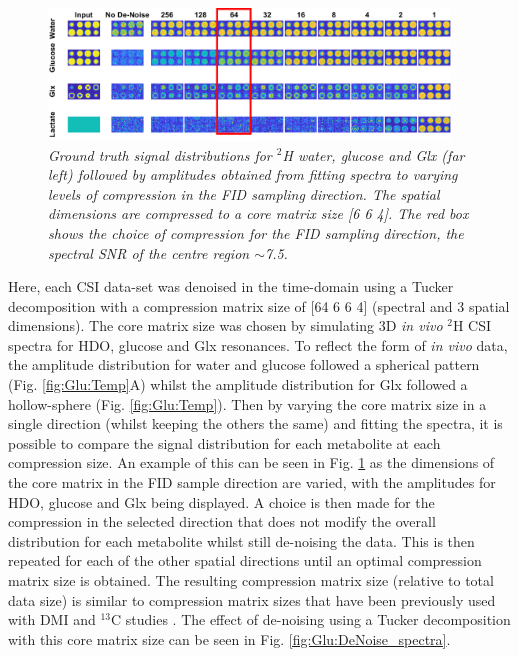 \begin{figure}
   \centering
   \includegraphics[width = 0.95\textwidth]{Figures/Glucose/DeNoise_Sim.png}
   \caption{\textit{Ground truth signal distributions for $^2$H water, glucose and Glx (far left) followed by amplitudes obtained from fitting spectra to varying levels of compression in the FID sampling direction. The spatial dimensions are compressed to a core matrix size [6 6 4]. The red box shows the choice of compression for the FID sampling direction, the spectral \ac{SNR} of the centre region $\sim$7.5.}}
   \label{fig:Glu:DeNoise}
\end{figure}

Here, each \ac{CSI} data-set was denoised in the time-domain using a Tucker decomposition \cite{Bader2007EfficientTensors} with a compression matrix size of [64 6 6 4] (spectral and 3 spatial dimensions). The core matrix size was chosen by simulating 3D \textit{in vivo} $^2$H \ac{CSI} spectra for HDO, glucose and Glx resonances. To reflect the form of \textit{in vivo} data, the amplitude distribution for water and glucose followed a spherical pattern (Fig. \ref{fig:Glu:Temp}A) whilst the amplitude distribution for Glx followed a hollow-sphere (Fig. \ref{fig:Glu:Temp}). Then by varying the core matrix size in a single direction (whilst keeping the others the same) and fitting the spectra, it is possible to compare the signal distribution for each metabolite at each compression size. An example of this can be seen in Fig. \ref{fig:Glu:DeNoise} as the dimensions of the core matrix in the FID sample direction are varied, with the amplitudes for HDO, glucose and Glx being displayed. A choice is then made for the compression in the selected direction that does not modify the overall distribution for each metabolite whilst still de-noising the data. This is then repeated for each of the other spatial directions until an optimal compression matrix size is obtained. The resulting compression matrix size (relative to total data size) is similar to compression matrix sizes that have been previously used with \ac{DMI} \cite{vonMorze2021ComparisonT, Kreis2020MeasuringMRI} and $^{13}$C studies \cite{Brender2019DynamicHyperpolarization}. The effect of de-noising using a Tucker decomposition with this core matrix size can be seen in Fig. \ref{fig:Glu:DeNoise_spectra}.


